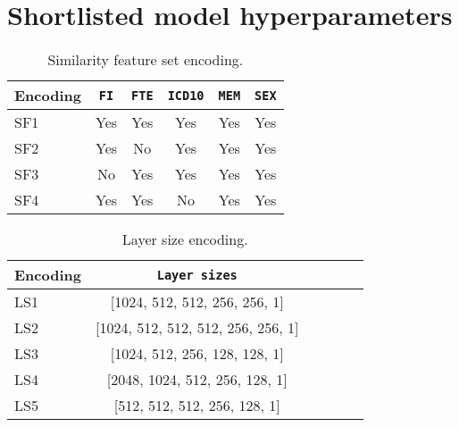 \chapter{Shortlisted model hyperparameters}

\begin{table}[]
    \caption{Similarity feature set encoding.}
    \centering
    \small
    \begin{tabular}{lccccc}
        \hline
    \textbf{Encoding} & \texttt{FI} &  \texttt{FTE}& \texttt{ICD10}& \texttt{MEM}& \texttt{SEX}\\  \hline
        SF1 & Yes & Yes & Yes & Yes & Yes \\
        SF2 & Yes & No & Yes & Yes & Yes \\
        SF3 & No & Yes & Yes & Yes & Yes \\
        SF4 & Yes & Yes & No & Yes & Yes \\ \hline
\end{tabular}
\end{table}

\begin{table}[]
    \caption{Layer size encoding.}
    \centering
    \small
    \begin{tabular}{lccccc}
        \hline
    \textbf{Encoding} & \texttt{Layer sizes} \\  \hline
        LS1 & [1024, 512, 512, 256, 256, 1] \\ 
        LS2 & [1024, 512, 512, 512, 256, 256, 1] \\
        LS3 & [1024, 512, 256, 128, 128, 1] \\
        LS4 & [2048, 1024, 512, 256, 128, 1] \\
        LS5 & [512, 512, 512, 256, 128, 1] \\ \hline
\end{tabular}
\end{table}

